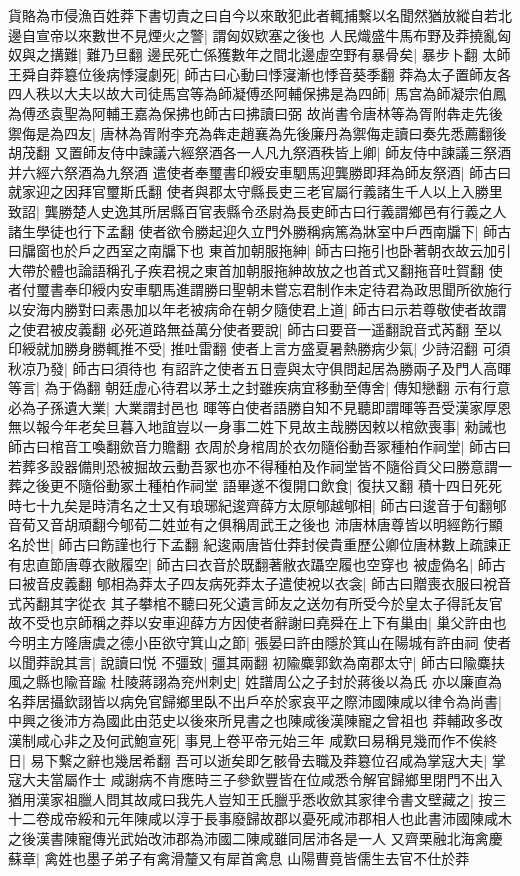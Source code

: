 貨賂為市侵漁百姓莽下書切責之曰自今以來敢犯此者輒捕繫以名聞然猶放縱自若北邊自宣帝以來數世不見煙火之警|{
	謂匈奴欵塞之後也}
人民熾盛牛馬布野及莽撓亂匈奴與之搆難|{
	難乃旦翻}
邊民死亡係獲數年之間北邊虛空野有暴骨矣|{
	暴步卜翻}
太師王舜自莽簒位後病悸寖劇死|{
	師古曰心動曰悸寖漸也悸音葵季翻}
莽為太子置師友各四人秩以大夫以故大司徒馬宫等為師凝傅丞阿輔保拂是為四師|{
	馬宫為師凝宗伯鳳為傅丞袁聖為阿輔王嘉為保拂也師古曰拂讀曰弼}
故尚書令唐林等為胥附犇走先後禦侮是為四友|{
	唐林為胥附李充為犇走趙襄為先後廉丹為禦侮走讀曰奏先悉薦翻後胡茂翻}
又置師友侍中諫議六經祭酒各一人凡九祭酒秩皆上卿|{
	師友侍中諫議三祭酒并六經六祭酒為九祭酒}
遣使者奉璽書印綬安車駟馬迎龔勝即拜為師友祭酒|{
	師古曰就家迎之因拜官璽斯氏翻}
使者與郡太守縣長吏三老官屬行義諸生千人以上入勝里致詔|{
	龔勝楚人史逸其所居縣百官表縣令丞尉為長吏師古曰行義謂鄉邑有行義之人諸生學徒也行下孟翻}
使者欲令勝起迎久立門外勝稱病篤為牀室中戶西南牖下|{
	師古曰牖窗也於戶之西室之南牖下也}
東首加朝服拖紳|{
	師古曰拖引也卧著朝衣故云加引大帶於體也論語稱孔子疾君視之東首加朝服拖紳故放之也首式又翻拖音吐賀翻}
使者付璽書奉印綬内安車駟馬進謂勝曰聖朝未嘗忘君制作未定待君為政思聞所欲施行以安海内勝對曰素愚加以年老被病命在朝夕隨使君上道|{
	師古曰示若尊敬使者故謂之使君被皮義翻}
必死道路無益萬分使者要說|{
	師古曰要音一遥翻說音式芮翻}
至以印綬就加勝身勝輒推不受|{
	推吐雷翻}
使者上言方盛夏暑熱勝病少氣|{
	少詩沼翻}
可須秋凉乃發|{
	師古曰須待也}
有詔許之使者五日壹與太守俱問起居為勝兩子及門人高暉等言|{
	為于偽翻}
朝廷虚心待君以茅土之封雖疾病宜移動至傳舍|{
	傳知戀翻}
示有行意必為子孫遺大業|{
	大業謂封邑也}
暉等白使者語勝自知不見聽即謂暉等吾受漢家厚恩無以報今年老矣旦暮入地誼豈以一身事二姓下見故主哉勝因敕以棺歛喪事|{
	勑誡也師古曰棺音工喚翻歛音力贍翻}
衣周於身棺周於衣勿隨俗動吾冢種柏作祠堂|{
	師古曰若葬多設器備則恐被掘故云動吾冢也亦不得種柏及作祠堂皆不隨俗貢父曰勝意謂一葬之後更不隨俗動冢土種柏作祠堂}
語畢遂不復開口飲食|{
	復扶又翻}
積十四日死死時七十九矣是時清名之士又有琅琊紀逡齊薛方太原郇越郇相|{
	師古曰逡音于旬翻郇音荀又音胡頑翻今郇荀二姓並有之俱稱周武王之後也}
沛唐林唐尊皆以明經飭行顯名於世|{
	師古曰飭謹也行下孟翻}
紀逡兩唐皆仕莽封侯貴重歷公卿位唐林數上疏諫正有忠直節唐尊衣敝履空|{
	師古曰衣音於既翻著敝衣躡空履也空穿也}
被虚偽名|{
	師古曰被音皮義翻}
郇相為莽太子四友病死莽太子遣使裞以衣衾|{
	師古曰贈喪衣服曰裞音式芮翻其字從衣}
其子攀棺不聽曰死父遺言師友之送勿有所受今於皇太子得託友官故不受也京師稱之莽以安車迎薛方方因使者辭謝曰堯舜在上下有巢由|{
	巢父許由也}
今明主方隆唐虞之德小臣欲守箕山之節|{
	張晏曰許由隱於箕山在陽城有許由祠}
使者以聞莽說其言|{
	說讀曰悦}
不彊致|{
	彊其兩翻}
初隃麋郭欽為南郡太守|{
	師古曰隃麋扶風之縣也隃音踰}
杜陵蔣詡為兖州刺史|{
	姓譜周公之子封於蔣後以為氏}
亦以廉直為名莽居攝欽詡皆以病免官歸鄉里臥不出戶卒於家哀平之際沛國陳咸以律令為尚書|{
	中興之後沛方為國此由范史以後來所見書之也陳咸後漢陳寵之曾祖也}
莽輔政多改漢制咸心非之及何武鮑宣死|{
	事見上卷平帝元始三年}
咸歎曰易稱見幾而作不俟終日|{
	易下繫之辭也幾居希翻}
吾可以逝矣即乞骸骨去職及莽簒位召咸為掌寇大夫|{
	掌寇大夫當屬作士}
咸謝病不肯應時三子參欽豐皆在位咸悉令解官歸鄉里閉門不出入猶用漢家祖臘人問其故咸曰我先人豈知王氏臘乎悉收歛其家律令書文壁藏之|{
	按三十二卷成帝綏和元年陳咸以淳于長事廢歸故郡以憂死咸沛郡相人也此書沛國陳咸木之後漢書陳寵傳光武始改沛郡為沛國二陳咸雖同居沛各是一人}
又齊栗融北海禽慶蘇章|{
	禽姓也墨子弟子有禽滑釐又有犀首禽息}
山陽曹竟皆儒生去官不仕於莽

